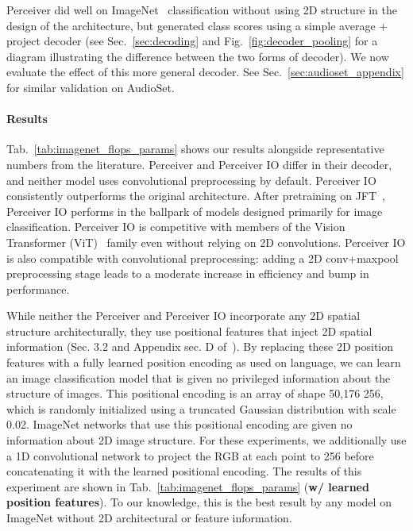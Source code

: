 \documentclass{article} \usepackage{iclr2022_conference,times}
\newcommand{\ourmodel}{Perceiver IO\xspace}
\begin{document}
Perceiver did well on ImageNet~\citep{deng2009imagenet} classification without using 2D structure in the design of the architecture, but generated class scores using a simple average + project decoder (see Sec.~\ref{sec:decoding} and Fig.~\ref{fig:decoder_pooling} for a diagram illustrating the difference between the two forms of decoder). We now evaluate the effect of this more general decoder. See Sec.~\ref{sec:audioset_appendix} for similar validation on AudioSet.

\paragraph{Results} Tab.~\ref{tab:imagenet_flops_params} shows our results alongside representative numbers from the literature. Perceiver and \ourmodel{} differ in their decoder, and neither model uses convolutional preprocessing by default. \ourmodel{} consistently outperforms the original architecture. After pretraining on JFT~\citep{sun2017revisiting}, \ourmodel{} performs in the ballpark of models designed primarily for image classification. \ourmodel{} is competitive with members of the Vision Transformer (ViT)~\citep{dosovitskiy2020image} family even without relying on 2D convolutions. \ourmodel{} is also compatible with convolutional preprocessing: adding a 2D conv+maxpool preprocessing stage leads to a moderate increase in efficiency and bump in performance.

While neither the Perceiver and \ourmodel{} incorporate any 2D spatial structure architecturally, they use positional features that inject 2D spatial information (Sec. 3.2 and Appendix sec. D of~\citealt{jaegle2021perceiver}). By replacing these 2D position features with a fully learned position encoding as used on language, we can learn an image classification model that is given no privileged information about the structure of images. This positional encoding is an array of shape 50,176  256, which is randomly initialized using a truncated Gaussian distribution with scale 0.02. ImageNet networks that use this positional encoding are given no information about 2D image structure. For these experiments, we additionally use a 1D convolutional network to project the RGB at each point to 256 before concatenating it with the learned positional encoding. The results of this experiment are shown in Tab.~\ref{tab:imagenet_flops_params} (\textbf{w/ learned position features}). To our knowledge, this is the best result by any model on ImageNet without 2D architectural or feature information.
\end{document}
